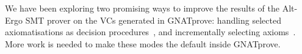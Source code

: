 \documentclass[sttt,draft]{svjour}
\newcommand{\gnatprove}{GNATprove\xspace}
\begin{document}
We have been exploring two promising ways to improve the results of the
Alt-Ergo SMT prover on the VCs generated in \gnatprove: handling selected
axiomatisations as decision procedures~\cite{dross:2012:smt}, and incrementally
selecting axioms~\cite{cgs09:ipo,kuhlwein:2012:ijcar}. More work is needed to
make these modes the default inside \gnatprove.



%


\end{document}
